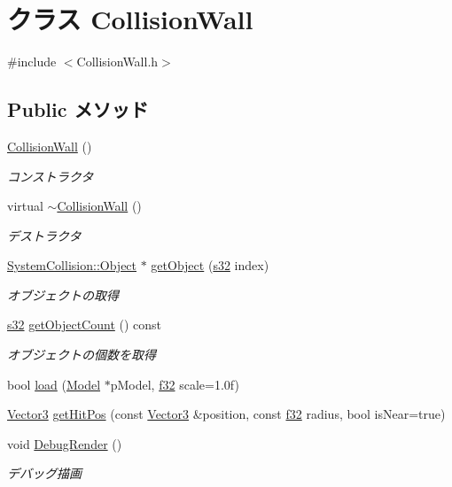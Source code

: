 \hypertarget{class_collision_wall}{\section{クラス Collision\-Wall}
\label{class_collision_wall}
}


{\ttfamily \#include $<$Collision\-Wall.\-h$>$}

\subsection*{Public メソッド}
\begin{DoxyCompactItemize}
\item 
\hyperlink{class_collision_wall_a3c34c3a90b40cfe726b143ce26770491}{Collision\-Wall} ()
\begin{DoxyCompactList}\small\item\em コンストラクタ \end{DoxyCompactList}\item 
virtual \hyperlink{class_collision_wall_a57043cf7416e207b2c1c3fdcde27bf0c}{$\sim$\-Collision\-Wall} ()
\begin{DoxyCompactList}\small\item\em デストラクタ \end{DoxyCompactList}\item 
\hyperlink{class_system_collision_1_1_object}{System\-Collision\-::\-Object} $\ast$ \hyperlink{class_collision_wall_a9b8e44ffa51d3e348b414f16f49117ef}{get\-Object} (\hyperlink{_main_8h_a0ce6887c26c1c49ad3be5710dd42bfd6}{s32} index)
\begin{DoxyCompactList}\small\item\em オブジェクトの取得 \end{DoxyCompactList}\item 
\hyperlink{_main_8h_a0ce6887c26c1c49ad3be5710dd42bfd6}{s32} \hyperlink{class_collision_wall_a3757d9055e006a2f5278b10978f6968e}{get\-Object\-Count} () const 
\begin{DoxyCompactList}\small\item\em オブジェクトの個数を取得 \end{DoxyCompactList}\item 
bool \hyperlink{class_collision_wall_a0058719cd3139056378cfce2c4c55306}{load} (\hyperlink{class_model}{Model} $\ast$p\-Model, \hyperlink{_main_8h_a5f6906312a689f27d70e9d086649d3fd}{f32} scale=1.\-0f)
\item 
\hyperlink{struct_vector3}{Vector3} \hyperlink{class_collision_wall_afcc25d40ed045d55168f093f9f2228ee}{get\-Hit\-Pos} (const \hyperlink{struct_vector3}{Vector3} \&position, const \hyperlink{_main_8h_a5f6906312a689f27d70e9d086649d3fd}{f32} radius, bool is\-Near=true)
\item 
void \hyperlink{class_collision_wall_ad51e61dd06453d9fe5c3b9e7e8150a39}{Debug\-Render} ()
\begin{DoxyCompactList}\small\item\em デバッグ描画 \end{DoxyCompactList}\end{DoxyCompactItemize}


